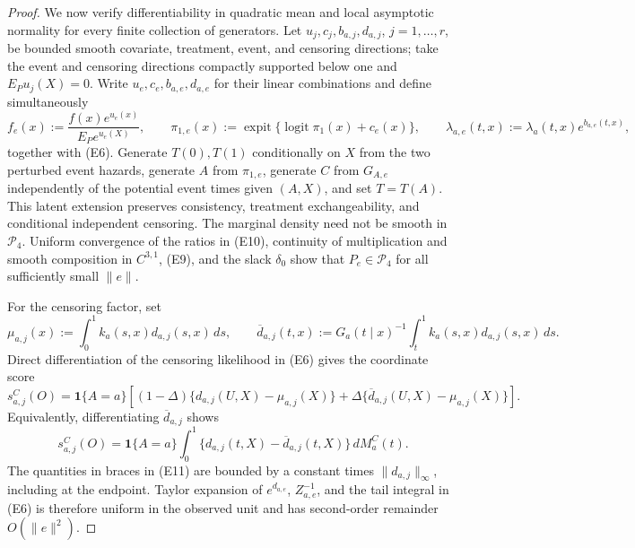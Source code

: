 \documentclass{article}
\begin{document}
\begin{proof}
We now verify differentiability in quadratic mean and local asymptotic normality for every finite collection of generators.  Let \(u_j,c_j,b_{a,j},d_{a,j}\), \(j=1,\ldots,r\), be bounded smooth covariate, treatment, event, and censoring directions; take the event and censoring directions compactly supported below one and \(E_Pu_j(X)=0\).  Write \(u_e,c_e,b_{a,e},d_{a,e}\) for their linear combinations and define simultaneously
\[
 f_e(x):=\frac{f(x)e^{u_e(x)}}{E_Pe^{u_e(X)}},\qquad
 \pi_{1,e}(x):=\operatorname{expit}\{\operatorname{logit}\pi_1(x)+c_e(x)\},
 \qquad \lambda_{a,e}(t,x):=\lambda_a(t,x)e^{b_{a,e}(t,x)},            \tag{E10}
\]
together with (E6).  Generate \(T(0),T(1)\) conditionally on \(X\) from the two perturbed event hazards, generate \(A\) from \(\pi_{1,e}\), generate \(C\) from \(G_{A,e}\) independently of the potential event times given \((A,X)\), and set \(T=T(A)\).  This latent extension preserves consistency, treatment exchangeability, and conditional independent censoring.  The marginal density need not be smooth in \(\mathcal P_4\).  Uniform convergence of the ratios in (E10), continuity of multiplication and smooth composition in \(C^{3,1}\), (E9), and the slack \(\delta_0\) show that \(P_e\in\mathcal P_4\) for all sufficiently small \(\lVert e\rVert\).

For the censoring factor, set
\[
 \mu_{a,j}(x):=\int_0^1k_a(s,x)d_{a,j}(s,x)\,ds,\qquad
 \overline d_{a,j}(t,x):=G_a(t\mid x)^{-1}
                 \int_t^1k_a(s,x)d_{a,j}(s,x)\,ds.
\]
Direct differentiation of the censoring likelihood in (E6) gives the coordinate score
\[
 s^C_{a,j}(O)=\mathbf 1\{A=a\}\left[
 (1-\Delta)\{d_{a,j}(U,X)-\mu_{a,j}(X)\}
 +\Delta\{\overline d_{a,j}(U,X)-\mu_{a,j}(X)\}\right].              \tag{E11}
\]
Equivalently, differentiating \(\overline d_{a,j}\) shows
\[
 s^C_{a,j}(O)=\mathbf 1\{A=a\}\int_0^1
       \{d_{a,j}(t,X)-\overline d_{a,j}(t,X)\}\,dM_a^C(t).            \tag{E12}
\]
The quantities in braces in (E11) are bounded by a constant times \(\lVert d_{a,j}\rVert_\infty\), including at the endpoint.  Taylor expansion of \(e^{d_{a,e}}\), \(Z_{a,e}^{-1}\), and the tail integral in (E6) is therefore uniform in the observed unit and has second-order remainder \(O(\lVert e\rVert^2)\).


\end{proof}
\end{document}
